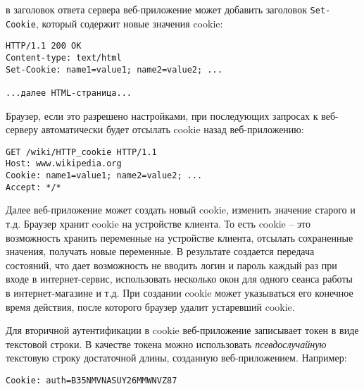 в заголовок ответа сервера веб-приложение может добавить заголовок \texttt{Set-Cookie}, который содержит новые значения cookie:
\begin{center} \begin{verbatim}
HTTP/1.1 200 OK
Content-type: text/html
Set-Cookie: name1=value1; name2=value2; ...

...далее HTML-страница...
\end{verbatim} \end{center}

Браузер, если это разрешено настройками, при последующих запросах к веб-серверу автоматически будет отсылать cookie назад веб-приложению:
\begin{center} \begin{verbatim}
GET /wiki/HTTP_cookie HTTP/1.1
Host: www.wikipedia.org
Cookie: name1=value1; name2=value2; ...
Accept: */*
\end{verbatim} \end{center}

Далее веб-приложение может создать новый cookie, изменить значение старого и т.д. Браузер хранит cookie на устройстве клиента. То есть cookie -- это возможность хранить переменные на устройстве клиента, отсылать сохраненные значения, получать новые переменные. В результате создается передача состояний, что дает возможность не вводить логин и пароль каждый раз при входе в интернет-сервис, использовать несколько окон для одного сеанса работы в интернет-магазине и т.д. При создании cookie может указываться его конечное время действия, после которого браузер удалит устаревший cookie.

Для вторичной аутентификации в cookie веб-приложение записывает токен в виде текстовой строки. В качестве токена можно использовать \emph{псевдослучайную} текстовую строку достаточной длины, созданную веб-приложением. Например:
\begin{center} \begin{verbatim}
Cookie: auth=B35NMVNASUY26MMWNVZ87
\end{verbatim} \end{center}

